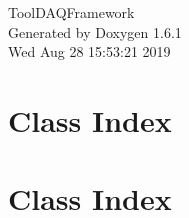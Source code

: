 \documentclass[a4paper]{book}
\begin{document}
\hypersetup{pageanchor=false}
\begin{titlepage}
\vspace*{7cm}
\begin{center}
{\Large ToolDAQFramework }\\
\vspace*{1cm}
{\large Generated by Doxygen 1.6.1}\\
\vspace*{0.5cm}
{\small Wed Aug 28 15:53:21 2019}\\
\end{center}
\end{titlepage}
\clearemptydoublepage
{}
\tableofcontents
\clearemptydoublepage
{}
\hypersetup{pageanchor=true}
\chapter{Class Index}

\chapter{Class Index}

\end{document}

